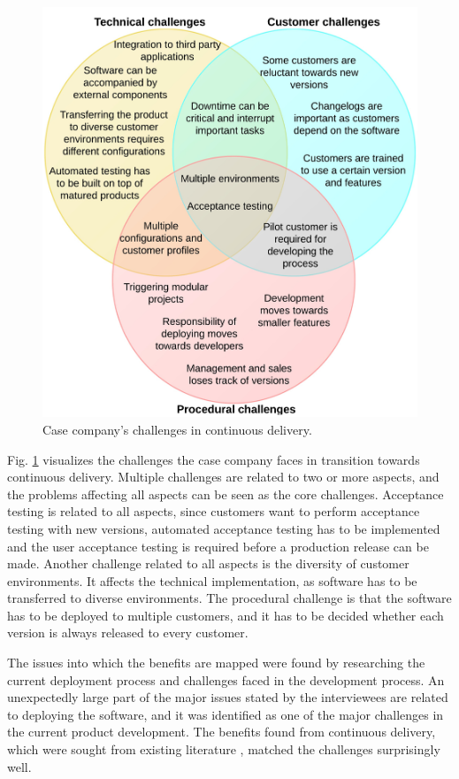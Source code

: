 \documentclass[lnbip]{svmultln}
\begin{document}
\begin{figure}[!htb]
  \centering
  \includegraphics[width=5.0in]{cd_challenges.jpeg}
  \caption{Case company's challenges in continuous delivery.}
  \label{fig1}
\end{figure}

Fig. \ref{fig1} visualizes the challenges the case company faces in transition towards continuous delivery. Multiple challenges are related to two or more aspects, and the problems affecting all aspects can be seen as the core challenges. Acceptance testing is related to all aspects, since customers want to perform acceptance testing with new versions, automated acceptance testing has to be implemented and the user acceptance testing is required before a production release can be made. Another challenge related to all aspects is the diversity of customer environments. It affects the technical implementation, as software has to be transferred to diverse environments. The procedural challenge is that the software has to be deployed to multiple customers, and it has to be decided whether each version is always released to every customer. 

The issues into which the benefits are mapped were found by researching the current deployment process and challenges faced in the development process. An unexpectedly large part of the major issues stated by the interviewees are related to deploying the software, and it was identified as one of the major challenges in the current product development. The benefits found from continuous delivery, which were sought from existing literature \cite{cdbook, neely2013continuous, humble2006deployment}, matched the challenges surprisingly well. %
\end{document}
